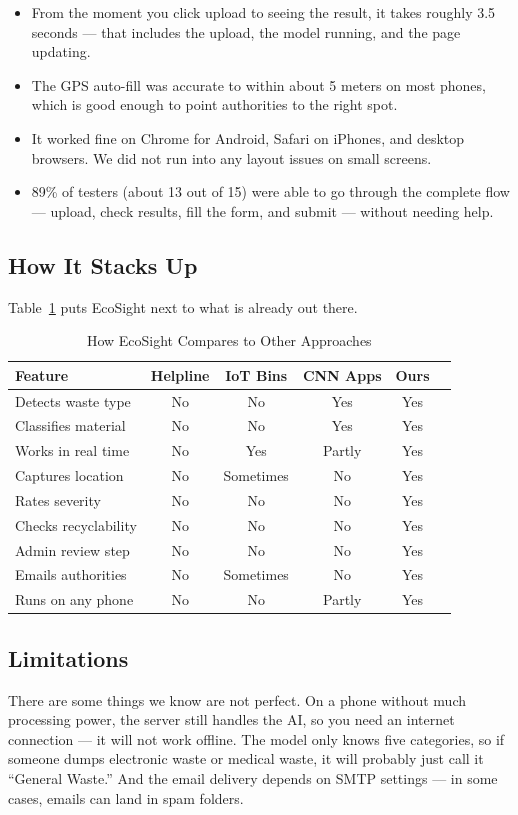 \documentclass[conference]{IEEEtran}
\begin{document}
\begin{itemize}[leftmargin=*]
    \item From the moment you click upload to seeing the result, it takes roughly 3.5 seconds — that includes the upload, the model running, and the page updating.
    \item The GPS auto-fill was accurate to within about 5 meters on most phones, which is good enough to point authorities to the right spot.
    \item It worked fine on Chrome for Android, Safari on iPhones, and desktop browsers. We did not run into any layout issues on small screens.
    \item 89\% of testers (about 13 out of 15) were able to go through the complete flow — upload, check results, fill the form, and submit — without needing help.
\end{itemize}

\subsection{How It Stacks Up}
Table~\ref{tab:comparison} puts EcoSight next to what is already out there.

\begin{table}[H]
\centering
\caption{How EcoSight Compares to Other Approaches}
\label{tab:comparison}
\begin{tabular}{@{}lccccc@{}}
\toprule
\textbf{Feature} & \textbf{Helpline} & \textbf{IoT Bins} & \textbf{CNN Apps} & \textbf{Ours} \\
\midrule
Detects waste type & No & No & Yes & Yes \\
Classifies material & No & No & Yes & Yes \\
Works in real time & No & Yes & Partly & Yes \\
Captures location & No & Sometimes & No & Yes \\
Rates severity & No & No & No & Yes \\
Checks recyclability & No & No & No & Yes \\
Admin review step & No & No & No & Yes \\
Emails authorities & No & Sometimes & No & Yes \\
Runs on any phone & No & No & Partly & Yes \\
\bottomrule
\end{tabular}
\end{table}

\subsection{Limitations}
There are some things we know are not perfect. On a phone without much processing power, the server still handles the AI, so you need an internet connection — it will not work offline. The model only knows five categories, so if someone dumps electronic waste or medical waste, it will probably just call it ``General Waste.'' And the email delivery depends on SMTP settings — in some cases, emails can land in spam folders.
\end{document}
